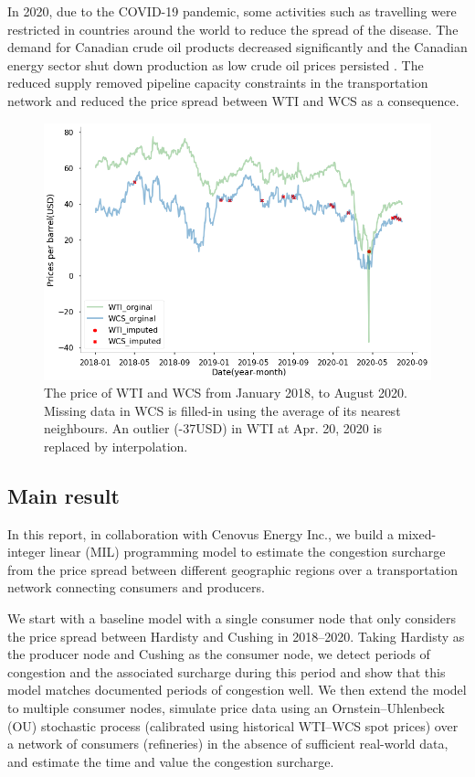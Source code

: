 \documentclass[11pt]{m2pi}
\begin{document}
In 2020, due to the COVID-19 pandemic, some activities such as travelling were restricted in countries around the world to reduce the spread of the disease. The demand for Canadian crude oil products decreased significantly and the Canadian energy sector shut down production as low crude oil prices persisted \cite{CER2020}. The reduced supply removed pipeline capacity constraints in the transportation network and reduced the price spread between WTI and WCS as a consequence.
\begin{figure}[h!]
    \includegraphics[width=\textwidth]{WTS_WCS_updated.png}
    \caption{The price of WTI and WCS from January 2018, to August 2020. Missing data in WCS is filled-in using the average of its nearest neighbours. An outlier (-37USD) in WTI at Apr. 20, 2020 is replaced by interpolation.}
    \label{fig:spread}
\end{figure}
\subsection{Main result}
In this report, in collaboration with Cenovus Energy Inc., we build a mixed-integer linear (MIL) programming model to estimate the congestion surcharge from the price spread between different geographic regions over a transportation network connecting consumers and producers.

We start with a baseline model with a single consumer node that only considers the price spread between Hardisty and Cushing in 2018--2020. Taking Hardisty as the producer node and Cushing as the consumer node, we detect periods of congestion and the associated surcharge during this period and show that this model matches documented periods of congestion well. We then extend the model to multiple consumer nodes, simulate price data using an Ornstein–Uhlenbeck (OU) stochastic process (calibrated using historical WTI--WCS spot prices) over a network of consumers (refineries) in the absence of sufficient real-world data, and estimate the time and value the congestion surcharge. 
\end{document}
